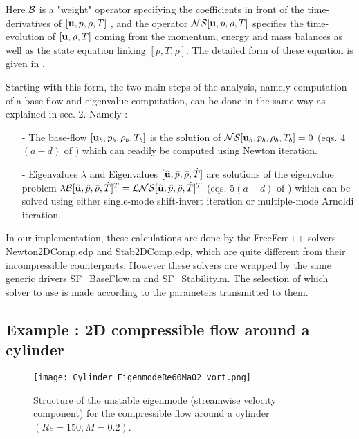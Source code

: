 \documentclass[twocolumn,10pt]{asme2ej}
\begin{document}
Here $\cal B$ is a "weight" operator specifying the coefficients in front of the time-derivatives of $[{\bf u},p,\rho,T]$ , and the operator $ {\cal NS}  [{\bf u},p,\rho,T] $ specifies the time-evolution of  $[{\bf u},\rho,T]$ coming from the momentum, energy and mass balances as well as the state equation linking $[p,T,\rho]$. The detailed form of these equation is given in \cite{Fani2018}. 

Starting with this form, the two main steps of the analysis, namely computation of a base-flow and eigenvalue computation, can be done in the same way as explained in sec. 2. Namely :
\begin{itemize}
\item[-] The base-flow $[{\bf u}_b,p_b,\rho_b,T_b]$ is the solution of ${\cal NS}  [{\bf u}_b,p_b,\rho_b,T_b]=0$ (eqs. 4$(a-d)$ of  \cite{Fani2018}) which can readily be computed using Newton iteration.
\item[-] Eigenvalues $\lambda$ and Eigenvalues $[\hat{{\bf u}},\hat{p},\hat{\rho},\hat{T}]$ are solutions of the eigenvalue problem $\lambda {\cal B}  [\hat{{\bf u}},\hat{p},\hat{\rho},\hat{T}]^T = {\cal LNS} [\hat{{\bf u}},\hat{p},\hat{\rho},\hat{T}]^T $ (eqs. 5$(a-d)$ of  \cite{Fani2018}) which can be solved using either single-mode shift-invert iteration or multiple-mode Arnoldi iteration.
\end{itemize}

In our implementation, these calculations are done by the FreeFem++ solvers {\sf  Newton2DComp.edp} and {\sf  Stab2DComp.edp}, which are quite different from their incompressible counterparts. However these solvers are wrapped by the same generic drivers {\sf  SF\_BaseFlow.m}  and {\sf  SF\_Stability.m}. The selection of which solver to use is made according to the parameters transmitted to them. 

\subsection{Example : 2D compressible flow around a cylinder}

 \begin{figure}
\texttt{[image: Cylinder\_EigenmodeRe60Ma02\_vort.png]}
\caption{Structure of the unstable eigenmode (streamwise velocity component) for the compressible flow around a cylinder  $(Re= 150,M=0.2)$.}
\label{fig:compcyl_ux} 
\end{figure}
\end{document}
